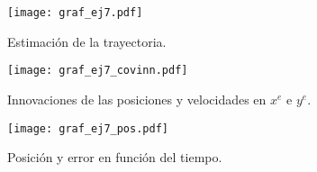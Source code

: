 

\vspace*{\fill}
\begin{figure}[H]
\centering
\texttt{[image: graf\_ej7.pdf]}
\caption{Estimación de la trayectoria.}
\label{fig:ej7} 
\end{figure}


\vspace*{\fill}
\begin{figure}[H]
\centering
\texttt{[image: graf\_ej7\_covinn.pdf]}
\caption{Innovaciones de las posiciones y velocidades en $x^e$ e $y^e$.}
\label{fig:7covinn} 
\end{figure}
\vspace*{\fill}


\pagebreak



\vspace*{\fill}
\begin{figure}[H]
\centering
\texttt{[image: graf\_ej7\_pos.pdf]}
\caption{Posición y error en función del tiempo.}
\label{fig:7pos} 
\end{figure}
\vspace*{\fill}

\pagebreak





